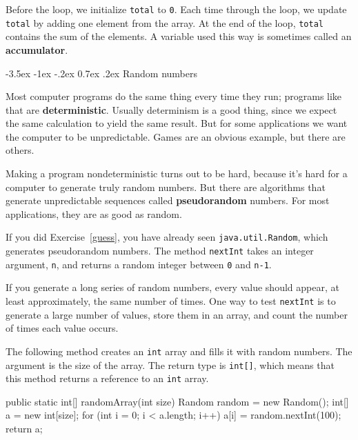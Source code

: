\documentclass[12pt]{book}
\makeatletter
\theoremstyle{exercise}
\newcommand{\java}[1]{\verb"#1"}
\renewcommand{\section}{\@startsection{section}{1}{\z@}%
    {-3.5ex \@plus -1ex \@minus -.2ex}%
    {0.7ex \@plus.2ex}%
    {\normalfont\Large\bfseries}}
\newcommand{\java}[1]{\lstinline{#1}} %
\makeatother
\begin{document}
Before the loop, we initialize \java{total} to \java{0}.
Each time through the loop, we update \java{total} by adding one element from the array.
At the end of the loop, \java{total} contains the sum of the elements.
A variable used this way is sometimes called an {\bf accumulator}.


\section{Random numbers}
\label{random}
\label{pseudorandom}


Most computer programs do the same thing every time they run; programs like that are {\bf deterministic}.
Usually determinism is a good thing, since we expect the same calculation to yield the same result.
But for some applications we want the computer to be unpredictable.
Games are an obvious example, but there are others.


Making a program nondeterministic turns out to be hard, because it's hard for a computer to generate truly random numbers.
But there are algorithms that generate unpredictable sequences called {\bf pseudorandom} numbers.
For most applications, they are as good as random.


If you did Exercise~\ref{guess}, you have already seen \java{java.util.Random}, which generates pseudorandom numbers.
The method \java{nextInt} takes an integer argument, \java{n}, and
returns a random integer between \java{0} and \java{n-1}.

If you generate a long series of random numbers, every value should appear, at least approximately, the same number of times.
One way to test \java{nextInt} is to generate a large number of values, store them in an array, and count the number of times each value occurs.

The following method creates an \java{int} array and fills it with random numbers.
The argument is the size of the array.
The return type is \java{int[]}, which means that this method returns a reference to an \java{int} array.

\begin{code}
    public static int[] randomArray(int size) {
	Random random = new Random();
        int[] a = new int[size];
        for (int i = 0; i < a.length; i++) {
            a[i] = random.nextInt(100);
        }
        return a;
    }
\end{code}
\end{document}
